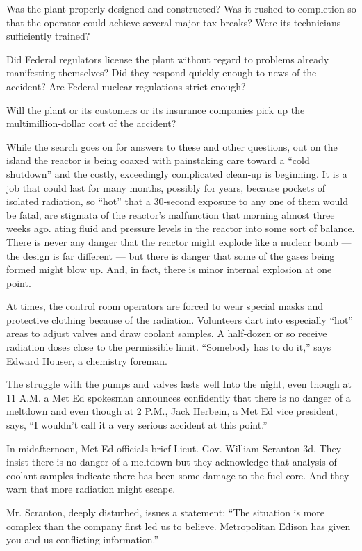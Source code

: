 Was the plant properly designed and constructed? Was it rushed to
completion so that the operator could achieve several major tax breaks?
Were its technicians sufficiently trained?

Did Federal regulators license the plant without regard to problems
already manifesting themselves? Did they respond quickly enough to news
of the accident? Are Federal nuclear regulations strict enough?

Will the plant or its customers or its insurance companies pick up the
multimillion‐dollar cost of the accident?

While the search goes on for answers to these and other questions, out
on the island the reactor is being coaxed with painstaking care toward a
``cold shutdown'' and the costly, exceedingly complicated clean‐up is
beginning. It is a job that could last for many months, possibly for
years, because pockets of isolated radiation, so ``hot'' that a
30‐second exposure to any one of them would be fatal, are stigmata of
the reactor's malfunction that morning almost three weeks ago. ating
fluid and pressure levels in the reactor into some sort of balance.
There is never any danger that the reactor might explode like a nuclear
bomb --- the design is far different --- but there is danger that some
of the gases being formed might blow up. And, in fact, there is minor
internal explosion at one point.

At times, the control room operators are forced to wear special masks
and protective clothing because of the radiation. Volunteers dart into
especially ``hot'' areas to adjust valves and draw coolant samples. A
half‐dozen or so receive radiation doses close to the permissible limit.
``Somebody has to do it,'' says Edward Houser, a chemistry foreman.

The struggle with the pumps and valves lasts well Into the night, even
though at 11 A.M. a Met Ed spokesman announces confidently that there is
no danger of a meltdown and even though at 2 P.M., Jack Herbein, a Met
Ed vice president, says, ``I wouldn't call it a very serious accident at
this point.''

In midafternoon, Met Ed officials brief Lieut. Gov. William Scranton 3d.
They insist there is no danger of a meltdown but they acknowledge that
analysis of coolant samples indicate there has been some damage to the
fuel core. And they warn that more radiation might escape.

Mr. Scranton, deeply disturbed, issues a statement: ``The situation is
more complex than the company first led us to believe. Metropolitan
Edison has given you and us conflicting information.''

